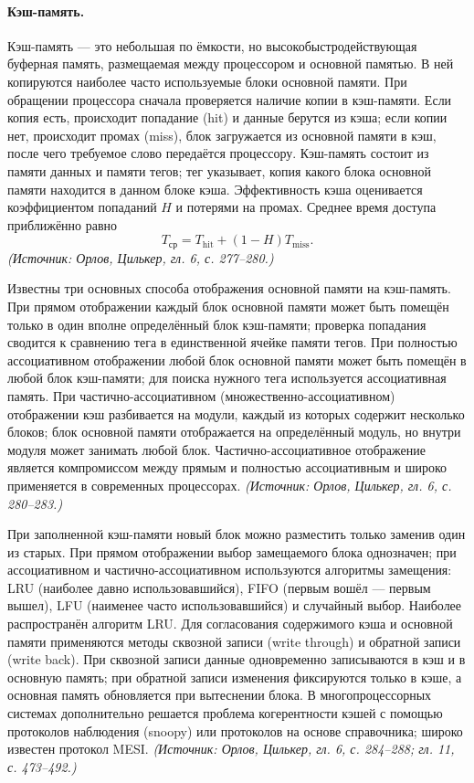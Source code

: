\documentclass[a4paper,12pt]{article}
\begin{document}
\paragraph{Кэш-память.}
Кэш-память --- это небольшая по ёмкости, но высокобыстродействующая буферная память, размещаемая между процессором и основной памятью. В ней копируются наиболее часто используемые блоки основной памяти. При обращении процессора сначала проверяется наличие копии в кэш-памяти. Если копия есть, происходит попадание (hit) и данные берутся из кэша; если копии нет, происходит промах (miss), блок загружается из основной памяти в кэш, после чего требуемое слово передаётся процессору. Кэш-память состоит из памяти данных и памяти тегов; тег указывает, копия какого блока основной памяти находится в данном блоке кэша. Эффективность кэша оценивается коэффициентом попаданий \(H\) и потерями на промах. Среднее время доступа приближённо равно
\[
T_{\text{ср}}=T_{\text{hit}}+(1-H)T_{\text{miss}}.
\]
\textit{(Источник: Орлов, Цилькер, гл. 6, с. 277--280.)}

Известны три основных способа отображения основной памяти на кэш-память. При прямом отображении каждый блок основной памяти может быть помещён только в один вполне определённый блок кэш-памяти; проверка попадания сводится к сравнению тега в единственной ячейке памяти тегов. При полностью ассоциативном отображении любой блок основной памяти может быть помещён в любой блок кэш-памяти; для поиска нужного тега используется ассоциативная память. При частично-ассоциативном (множественно-ассоциативном) отображении кэш разбивается на модули, каждый из которых содержит несколько блоков; блок основной памяти отображается на определённый модуль, но внутри модуля может занимать любой блок. Частично-ассоциативное отображение является компромиссом между прямым и полностью ассоциативным и широко применяется в современных процессорах.
\textit{(Источник: Орлов, Цилькер, гл. 6, с. 280--283.)}

При заполненной кэш-памяти новый блок можно разместить только заменив один из старых. При прямом отображении выбор замещаемого блока однозначен; при ассоциативном и частично-ассоциативном используются алгоритмы замещения: LRU (наиболее давно использовавшийся), FIFO (первым вошёл --- первым вышел), LFU (наименее часто использовавшийся) и случайный выбор. Наиболее распространён алгоритм LRU. Для согласования содержимого кэша и основной памяти применяются методы сквозной записи (write through) и обратной записи (write back). При сквозной записи данные одновременно записываются в кэш и в основную память; при обратной записи изменения фиксируются только в кэше, а основная память обновляется при вытеснении блока. В многопроцессорных системах дополнительно решается проблема когерентности кэшей с помощью протоколов наблюдения (snoopy) или протоколов на основе справочника; широко известен протокол MESI.
\textit{(Источник: Орлов, Цилькер, гл. 6, с. 284--288; гл. 11, с. 473--492.)}
\end{document}
